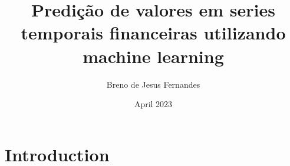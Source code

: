 \documentclass{article}
\title{Predição de valores em series temporais financeiras utilizando machine learning}
\author{Breno de Jesus Fernandes }
\date{April 2023}
\begin{document}
\maketitle

\section{Introduction}
\end{document}
